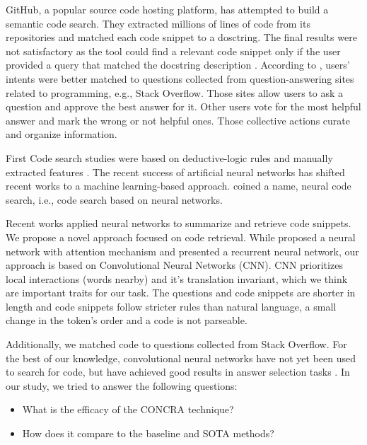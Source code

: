 \documentclass[sigconf]{acmart}
\begin{document}
GitHub, a popular source code hosting platform, has attempted to build a semantic code search. They extracted millions of lines of code from its repositories and matched each code snippet to a dosctring. The final results were not satisfactory as the tool could find a relevant code snippet only if the user provided a query that matched the docstring description \citep{husain-github-semantic-search-code-2019}. According to \citet{cambronero-deep-code-search-2019}, users' intents were better matched to questions collected from question-answering sites related to programming, e.g., Stack Overflow. Those sites allow users to ask a question and approve the best answer for it. Other users vote for the most helpful answer and mark the wrong or not helpful ones. Those collective actions curate and organize information.

First Code search studies were based on deductive-logic rules and manually extracted features \cite{Allamanis:2018:SML}. The recent success of artificial neural networks has shifted recent works to a machine learning-based approach. \citet{cambronero-deep-code-search-2019} coined a name, neural code search, i.e., code search based on neural networks.

Recent works applied neural networks to summarize and retrieve code snippets. We propose a novel approach focused on code retrieval. While \citet{cambronero-deep-code-search-2019} proposed a neural network with attention mechanism and \citet{Gu-deep-code-search:2018} presented a recurrent neural network, our approach is based on Convolutional Neural Networks (CNN).  CNN prioritizes local interactions (words nearby) and it's translation invariant, which we think are important traits for our task. The questions and code snippets are shorter in length and code snippets follow stricter rules than natural language, a small change in the token's order and a code is not parseable. 

Additionally, we matched code to questions collected from Stack Overflow. For the best of our knowledge, convolutional neural networks have not yet been used to search for code, but have achieved good results in answer selection tasks \citep{feng-2015, wen-joint-modeling-question-answer-2019}. In our study, we tried to answer the following questions:

\begin{itemize}
    \item What is the efficacy of the CONCRA technique? 
    \item How does it compare to the baseline and SOTA methods?
\end{itemize}
\end{document}
